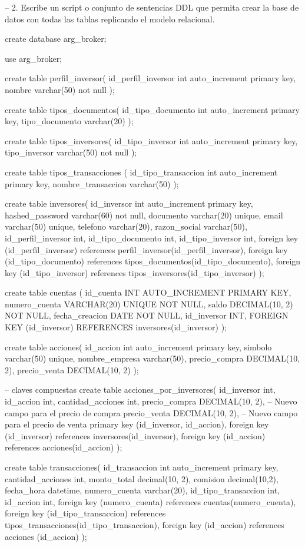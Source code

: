 – 2. Escribe un script o conjunto de sentencias DDL que permita crear la base de datos
con todas las tablas replicando el modelo relacional.

create database arg_broker;

use arg_broker;

create table perfil_inversor(
id_perfil_inversor int auto_increment primary key,
nombre varchar(50) not null
);

create table tipos_documentos(
id_tipo_documento int auto_increment primary key,
tipo_documento varchar(20)
);

create table tipos_inversores(
id_tipo_inversor int auto_increment primary key,
tipo_inversor varchar(50) not null
);

create table tipos_transacciones (
id_tipo_transaccion int auto_increment primary key,
nombre_transaccion varchar(50)
);

create table inversores(
id_inversor int auto_increment primary key,
hashed_password varchar(60) not null,
documento varchar(20) unique,
email varchar(50) unique,
telefono varchar(20),
razon_social varchar(50),
id_perfil_inversor int,
id_tipo_documento int,
id_tipo_inversor int,
foreign key (id_perfil_inversor) references perfil_inversor(id_perfil_inversor),
foreign key (id_tipo_documento) references tipos_documentos(id_tipo_documento),
foreign key (id_tipo_inversor) references tipos_inversores(id_tipo_inversor)
);

create table cuentas (
  id_cuenta INT AUTO_INCREMENT PRIMARY KEY,
  numero_cuenta VARCHAR(20) UNIQUE NOT NULL,
  saldo DECIMAL(10, 2) NOT NULL,
  fecha_creacion DATE NOT NULL,
  id_inversor INT,
  FOREIGN KEY (id_inversor) REFERENCES inversores(id_inversor)
);

create table acciones(
id_accion int auto_increment primary key,
simbolo varchar(50) unique,
nombre_empresa varchar(50),
precio_compra DECIMAL(10, 2),
precio_venta DECIMAL(10, 2)
);

-- claves compuestas
create table acciones_por_inversores(
id_inversor int,
id_accion int,
cantidad_acciones int,
precio_compra DECIMAL(10, 2), -- Nuevo campo para el precio de compra
precio_venta DECIMAL(10, 2),  -- Nuevo campo para el precio de venta
primary key (id_inversor, id_accion),
foreign key (id_inversor) references inversores(id_inversor),
foreign key (id_accion) references acciones(id_accion)
);

create table transacciones(
id_transaccion int auto_increment primary key,
cantidad_acciones int,
monto_total decimal(10, 2),
comision decimal(10,2),
fecha_hora datetime,
numero_cuenta varchar(20),
id_tipo_transaccion int,
id_accion int,
foreign key (numero_cuenta) references cuentas(numero_cuenta),
foreign key (id_tipo_transaccion) references tipos_transacciones(id_tipo_transaccion),
foreign key (id_accion) references acciones (id_accion)
);




